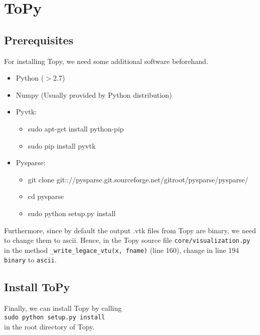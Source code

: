 \documentclass[11pt,a4paper,bibtotoc,idxtotoc,headsepline,footsepline,footexclude,DIV13,oneside]{scrbook}
\begin{document}
	\frontmatter
	
	
	
	
	
	
	
	
	\listoftodos
	\tableofcontents

	\mainmatter

	\chapter{ToPy}
	\section{Prerequisites}
	For installing Topy, we need some additional software beforehand.
	\begin{itemize}
	\item Python ($>$2.7)
	\item Numpy (Usually provided by Python distribution)
	\item Pyvtk:
		\begin{itemize}
		\item sudo apt-get install python-pip
		\item sudo pip install pyvtk
		\end{itemize}
	\item Pysparse:
		\begin{itemize}
		\item git clone git:://pysparse.git.sourceforge.net/gitroot/pysparse/pysparse/
		\item cd pysparse
		\item sudo python setup.py install		
		\end{itemize}
	\end{itemize}
	Furthermore, since by default the output .vtk files from Topy are binary, we need to change them to ascii. Hence, in the Topy source file \texttt{core/visualization.py} in the method \texttt{{\_}write{\_}legace{\_}vtu(x, fname)} (line 160), change in line 194 \texttt{binary} to \texttt{ascii}.
	
	\section{Install ToPy}
	Finally, we can install Topy by calling \\
	\texttt{sudo python setup.py install} \\
	in the root directory of Topy.
\end{document}
